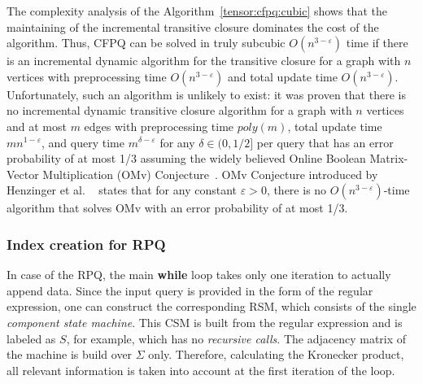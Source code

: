 The complexity analysis of the Algorithm~\ref{tensor:cfpq:cubic} shows that the maintaining of the incremental transitive closure dominates the cost of the algorithm. Thus, CFPQ can be solved in truly subcubic $O(n^{3-\varepsilon})$ time if there is an incremental dynamic algorithm for the transitive closure for a graph with $n$ vertices with preprocessing time $O(n^{3-\varepsilon})$ and total update time $O(n^{3-\varepsilon})$. Unfortunately, such an algorithm is unlikely to exist: it was proven that there is no incremental dynamic transitive closure algorithm for a graph with $n$ vertices and at most $m$ edges with preprocessing time $poly(m)$, total update time $mn^{1-\varepsilon}$, and query time $m^{\delta-\varepsilon}$ for any $\delta \in (0, 1/2]$ per query that has an error probability of at most 1/3 assuming the widely believed Online Boolean Matrix-Vector Multiplication (OMv) Conjecture~\cite{10.1145/2746539.2746609}. OMv Conjecture introduced by Henzinger et al. ~\cite{10.1145/2746539.2746609} states that for any constant $ \varepsilon>0$, there is no $O(n^{3-\varepsilon})$-time algorithm that solves OMv with an error probability of at most 1/3. 



\subsubsection{Index creation for RPQ}
In case of the RPQ, the main \textbf{while} loop takes only one iteration to actually append data.
Since the input query is provided in the form of the regular expression, one can construct the corresponding RSM, which consists of the single \textit{component state machine}.
This CSM is built from the regular expression and is labeled as $S$, for example, which has no \textit{recursive calls}.
The adjacency matrix of the machine is build over $\Sigma$ only.
Therefore, calculating the Kronecker product, all relevant information is taken into account at the first iteration of the loop.